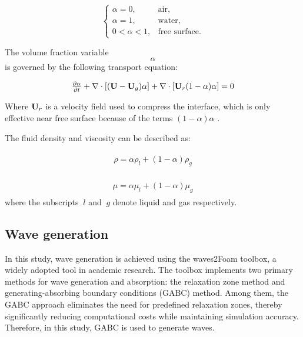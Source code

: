 \documentclass[%
 aip,
 amsmath,amssymb,
 reprint,%
]{revtex4-1}
\begin{document}
\begin{equation}
\begin{cases}
\alpha = 0,      & \text{air}, \\
\alpha = 1,      & \text{water}, \\
0 < \alpha < 1,  & \text{free surface}.
\end{cases}
\label{con:rewardinDRL}
\end{equation}

The volume fraction variable $$\alpha$$ is governed by the following transport equation:

\begin{equation}
\begin{array}{l}
\frac{{\partial \alpha }}{{\partial t}} + \nabla  \cdot \left[ {({\bf{U}} - {{\bf{U}}_g})\alpha } \right] + \nabla  \cdot \left[ {{{\bf{U}}_r}(1 - \alpha )\alpha } \right] = 0
\end{array}
\label{con:rewardinDRL}
\end{equation}

Where ${\bf{U}}_r$ is a velocity field used to compress the interface\citet{shen2013rans}, which is only effective near free surface because of the terms $(1 - \alpha )\alpha$ .


The fluid density and viscosity can be described as:

\begin{equation}
\begin{array}{l}
\begin{array}{l}
\rho  = \alpha {\rho _l} + (1 - \alpha ){\rho _g}
\end{array}
\end{array}
\label{con:rewardinDRL}
\end{equation}

\begin{equation}
\begin{array}{l}
\begin{array}{l}
\mu  = \alpha {\mu _l} + (1 - \alpha ){\mu _g}
\end{array}
\end{array}
\label{con:rewardinDRL}
\end{equation}
where the subscripts $\ l$ and $\ g$ denote liquid and gas respectively.

\subsection{Wave generation}

In this study, wave generation is achieved using the waves2Foam toolbox, a widely adopted tool in academic research. The toolbox implements two primary methods for wave generation and absorption: the relaxation zone method and generating-absorbing boundary conditions (GABC) method. Among them, the GABC approach eliminates the need for predefined relaxation zones, thereby significantly reducing computational costs while maintaining simulation accuracy. Therefore, in this study, GABC is used to generate waves.
\end{document}
